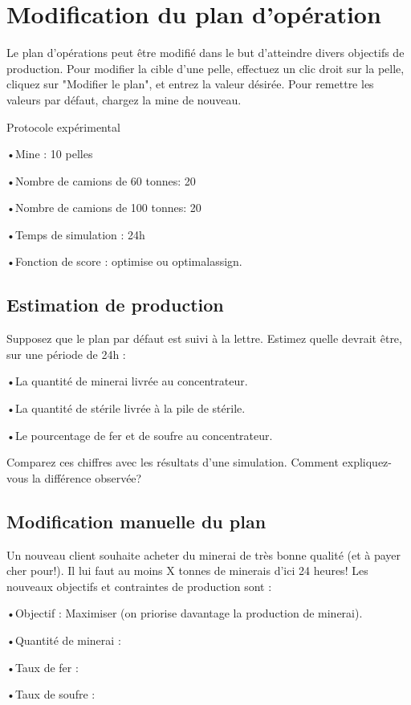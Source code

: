 \section{Modification du plan d'opération}

Le plan d'opérations peut être modifié dans le but d'atteindre divers objectifs de production. Pour modifier la cible d'une pelle, effectuez un clic droit sur la pelle, cliquez sur "Modifier le plan", et entrez la valeur désirée. Pour remettre les valeurs par défaut, chargez la mine de nouveau.

Protocole expérimental 

•Mine : 10 pelles

•Nombre de camions de 60 tonnes: 20

•Nombre de camions de 100 tonnes: 20

•Temps de simulation : 24h

•Fonction de score : optimise ou optimalassign.

\subsection{Estimation de production}

Supposez que le plan par défaut est suivi à la lettre. Estimez quelle devrait être, sur une période de 24h : 

•La quantité de minerai livrée au concentrateur.

•La quantité de stérile livrée à la pile de stérile.

•Le pourcentage de fer et de soufre au concentrateur.

Comparez ces chiffres avec les résultats d'une simulation. Comment expliquez-vous la différence observée?

\subsection{Modification manuelle du plan}

Un nouveau client souhaite acheter du minerai de très bonne qualité (et à payer cher pour!). Il lui faut au moins X tonnes de minerais d'ici 24 heures! Les nouveaux objectifs et contraintes de production sont : 

•Objectif : Maximiser (on priorise davantage la production de minerai).

•Quantité de minerai : 

•Taux de fer : 

•Taux de soufre : 

